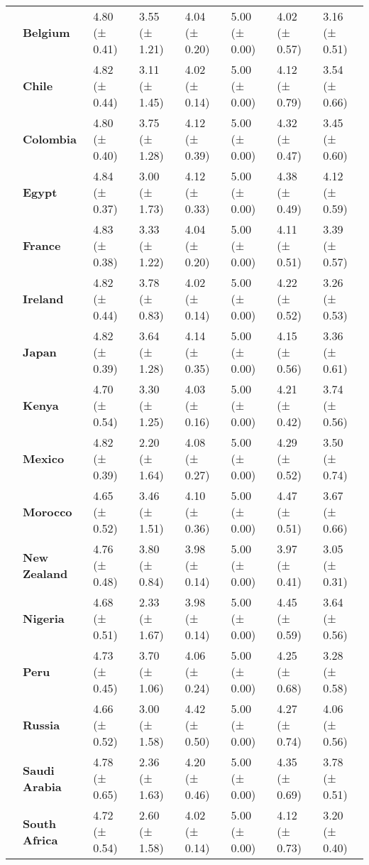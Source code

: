 \begin{longtable}{llllllll}
\textbf{} & \textbf{Belgium} & 4.80 (± 0.41) & 3.55 (± 1.21) & 4.04 (± 0.20) & 5.00 (± 0.00) & 4.02 (± 0.57) & 3.16 (± 0.51) \\
\textbf{} & \textbf{Chile} & 4.82 (± 0.44) & 3.11 (± 1.45) & 4.02 (± 0.14) & 5.00 (± 0.00) & 4.12 (± 0.79) & 3.54 (± 0.66) \\
\textbf{} & \textbf{Colombia} & 4.80 (± 0.40) & 3.75 (± 1.28) & 4.12 (± 0.39) & 5.00 (± 0.00) & 4.32 (± 0.47) & 3.45 (± 0.60) \\
\textbf{} & \textbf{Egypt} & 4.84 (± 0.37) & 3.00 (± 1.73) & 4.12 (± 0.33) & 5.00 (± 0.00) & 4.38 (± 0.49) & 4.12 (± 0.59) \\
\textbf{} & \textbf{France} & 4.83 (± 0.38) & 3.33 (± 1.22) & 4.04 (± 0.20) & 5.00 (± 0.00) & 4.11 (± 0.51) & 3.39 (± 0.57) \\
\textbf{} & \textbf{Ireland} & 4.82 (± 0.44) & 3.78 (± 0.83) & 4.02 (± 0.14) & 5.00 (± 0.00) & 4.22 (± 0.52) & 3.26 (± 0.53) \\
\textbf{} & \textbf{Japan} & 4.82 (± 0.39) & 3.64 (± 1.28) & 4.14 (± 0.35) & 5.00 (± 0.00) & 4.15 (± 0.56) & 3.36 (± 0.61) \\
\textbf{} & \textbf{Kenya} & 4.70 (± 0.54) & 3.30 (± 1.25) & 4.03 (± 0.16) & 5.00 (± 0.00) & 4.21 (± 0.42) & 3.74 (± 0.56) \\
\textbf{} & \textbf{Mexico} & 4.82 (± 0.39) & 2.20 (± 1.64) & 4.08 (± 0.27) & 5.00 (± 0.00) & 4.29 (± 0.52) & 3.50 (± 0.74) \\
\textbf{} & \textbf{Morocco} & 4.65 (± 0.52) & 3.46 (± 1.51) & 4.10 (± 0.36) & 5.00 (± 0.00) & 4.47 (± 0.51) & 3.67 (± 0.66) \\
\textbf{} & \textbf{New Zealand} & 4.76 (± 0.48) & 3.80 (± 0.84) & 3.98 (± 0.14) & 5.00 (± 0.00) & 3.97 (± 0.41) & 3.05 (± 0.31) \\
\textbf{} & \textbf{Nigeria} & 4.68 (± 0.51) & 2.33 (± 1.67) & 3.98 (± 0.14) & 5.00 (± 0.00) & 4.45 (± 0.59) & 3.64 (± 0.56) \\
\textbf{} & \textbf{Peru} & 4.73 (± 0.45) & 3.70 (± 1.06) & 4.06 (± 0.24) & 5.00 (± 0.00) & 4.25 (± 0.68) & 3.28 (± 0.58) \\
\textbf{} & \textbf{Russia} & 4.66 (± 0.52) & 3.00 (± 1.58) & 4.42 (± 0.50) & 5.00 (± 0.00) & 4.27 (± 0.74) & 4.06 (± 0.56) \\
\textbf{} & \textbf{Saudi Arabia} & 4.78 (± 0.65) & 2.36 (± 1.63) & 4.20 (± 0.46) & 5.00 (± 0.00) & 4.35 (± 0.69) & 3.78 (± 0.51) \\
\textbf{} & \textbf{South Africa} & 4.72 (± 0.54) & 2.60 (± 1.58) & 4.02 (± 0.14) & 5.00 (± 0.00) & 4.12 (± 0.73) & 3.20 (± 0.40) \\

\end{longtable}
